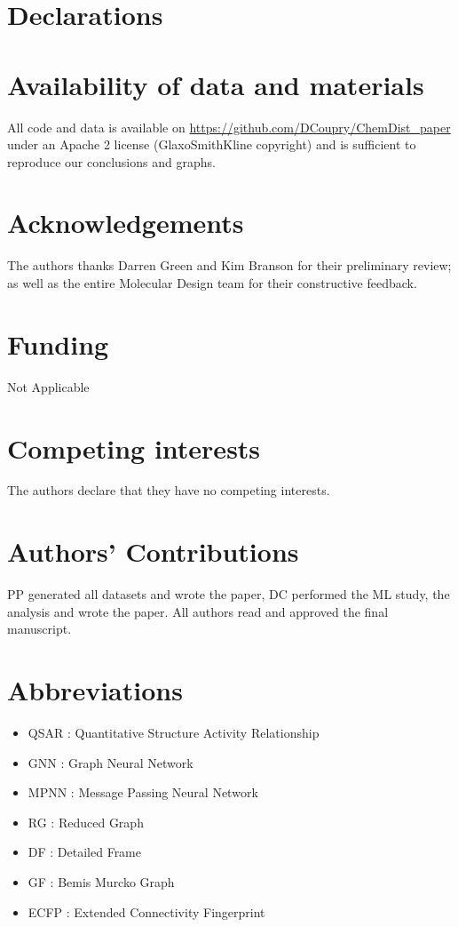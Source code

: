 \documentclass[doublespacing]{bmcart}
\begin{document}
\begin{backmatter}


\section*{Declarations}
\section*{Availability of data and materials}
All code and data is available on \href{https://github.com/DCoupry/ChemDist_paper}{https://github.com/DCoupry/ChemDist\_paper} under an Apache 2 license (GlaxoSmithKline copyright) and is sufficient to reproduce our conclusions and graphs.

\section*{Acknowledgements}

The authors thanks Darren Green and Kim Branson for their preliminary review; as well as the entire Molecular Design team for their constructive feedback.

\section*{Funding}
Not Applicable

\section*{Competing interests}
The authors declare that they have no competing interests.

\section*{Authors' Contributions}
PP generated all datasets and wrote the paper, DC performed the ML study, the analysis and wrote the paper. All authors read and approved the final manuscript.

\section*{Abbreviations}
\begin{itemize}
    \item QSAR  : Quantitative Structure Activity Relationship
    \item GNN : Graph Neural Network
    \item MPNN : Message Passing Neural Network
    \item RG : Reduced Graph
    \item DF : Detailed Frame
    \item GF : Bemis Murcko Graph
    \item ECFP :  Extended Connectivity Fingerprint
\end{itemize}



\end{backmatter}
\end{document}
